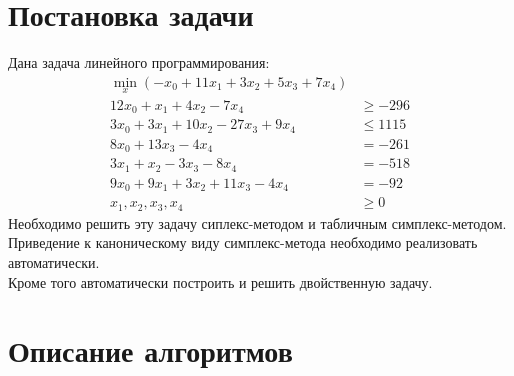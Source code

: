 
\usepackage{amsmath}




\renewcommand\contentsname{\centerline{Содержание}}
\tableofcontents
\newpage

\section{Постановка задачи}
Дана задача линейного программирования:
\begin{align*} 
\min_x (-x_0+11x_1+3x_2+5x_3+7x_4) \\
12x_0+x_1+4x_2-7x_4&\geq-296 \\
3x_0+3x_1+10x_2-27x_3+9x_4&\leq1115 \\
8x_0+13x_3-4x_4&=-261 \\
3x_1+x_2-3x_3-8x_4&=-518 \\
9x_0+9x_1+3x_2+11x_3-4x_4&=-92 \\
x_1, x_2, x_3, x_4&\geq0
\end{align*}
Необходимо решить эту задачу сиплекс-методом и табличным симплекс-методом.\\
Приведение к каноническому виду симплекс-метода необходимо реализовать автоматически. \\
Кроме того автоматически построить и решить двойственную задачу.

\section{Описание алгоритмов}
